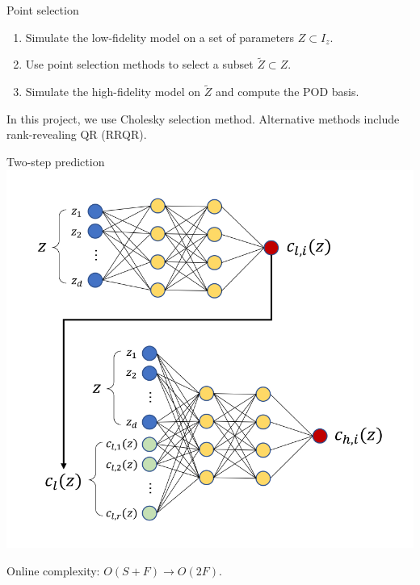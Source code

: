 \documentclass[10pt]{beamer}
\begin{document}
\begin{frame}{Point selection}
\begin{block}{}
\begin{enumerate}
\item Simulate the low-fidelity model on a set of parameters $Z\subset I_z $.
\item Use point selection methods to select a subset $\tilde{Z}\subset Z $.
\item Simulate the high-fidelity model on $\tilde{Z}$ and compute the POD basis.
\end{enumerate}
\end{block}

In this project, we use Cholesky selection method\cite{zhu2014computational}. Alternative methods include rank-revealing QR (RRQR).

\end{frame}

\begin{frame}{Two-step prediction}
\centering
\includegraphics[scale=0.5]{figures/Two-step.pdf}

Online complexity: $O(S+F) \to O(2F)$.
\end{frame}

\end{document}
